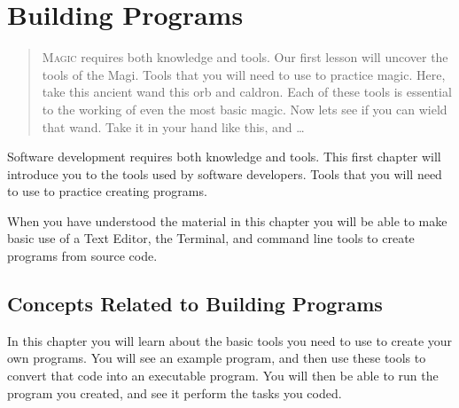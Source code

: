 \chapter{Building Programs} %
\label{cha:building programs}

\begin{quote}
  \Fontlukas\Large
  \renewcommand{\LettrineTextFont}{\relax}
  \lettrine[image=true,lines=3,lraise=0.1]
  {M}{agic} requires both knowledge and tools. Our first lesson will uncover the tools of the Magi. Tools that you will need to use to practice magic. Here, take this ancient wand this orb and caldron. Each of these tools is essential to the working of even the most basic magic. Now lets see if you can wield that wand. Take it in your hand like this, and \ldots
\end{quote}

\bigskip

Software development requires both knowledge and tools. This first chapter will introduce you to the tools used by software developers. Tools that you will need to use to practice creating programs.

When you have understood the material in this chapter you will be able to make basic use of a Text Editor, the Terminal, and command line tools to create programs from source code. 

\minitoc

\clearpage
\section{Concepts Related to Building Programs} %
\label{sec:concepts_related_to_building_programs}

In this chapter you will learn about the basic tools you need to use to create your own programs. You will see an example program, and then use these tools to convert that code into an executable program. You will then be able to run the program you created, and see it perform the tasks you coded.

